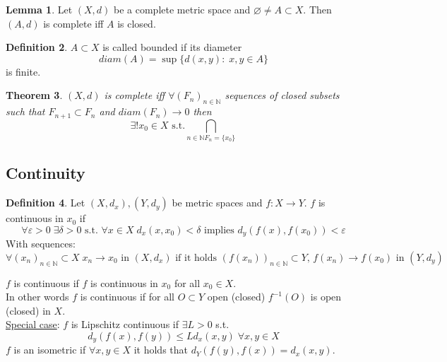 \documentclass[a4paper, 12pt]{article}
\theoremstyle{plain}
\newtheorem{theorem}{Theorem}[subsection] %
\theoremstyle{definition}
\newtheorem{definition}[theorem]{Definition} %
\theoremstyle{lemma}
\newtheorem{lemma}[theorem]{Lemma}
\theoremstyle{remark}
\theoremstyle{corollary}
\theoremstyle{example}
\begin{document}
	\begin{lemma}
		Let $(X,d)$ be a complete metric space and $\varnothing \neq A \subset X$. Then $(A,d)$ is complete iff $A$ is closed.
	\end{lemma}

	\begin{definition}
		$A \subset X$ is called bounded if its diameter \[diam(A) = \sup\{d(x,y): \; x,y \in A\}\] is finite.
	\end{definition}

	\begin{theorem}
		$(X,d)$ is complete iff $\forall (F_n)_{n \in \mathbb{N}}$ sequences of closed subsets such that $F_{n+1} \subset F_n$ and $diam(F_n) \to 0$ then \[\exists ! x_0 \in X \text{ s.t.} \bigcap\limits_{n \in \mathbb{N} F_n = \{x_0\}}\]
	\end{theorem}

	\subsection{Continuity}
	\begin{definition}
		Let $(X,d_x), (Y, d_y)$ be metric spaces and $f: X \to Y$. $f$ is continuous in $x_0$ if \[\forall \varepsilon > 0 \; \exists \delta > 0 \text{ s.t. } \forall x \in X \; d_x(x,x_0) < \delta \text{ implies } d_y(f(x),f(x_0)) < \varepsilon\]
		With sequences: \[\forall (x_n)_{n\in \mathbb{N}} \subset X \; x_n \to x_0 \text{ in } (X,d_x) \text{ if it holds } (f(x_n))_{n \in \mathbb{N}} \subset Y, \, f(x_n) \to f(x_0) \text{ in } (Y,d_y)\]
	\end{definition}
	$f$ is continuous if $f$ is continuous in $x_0$ for all $x_0 \in X$.\\
	In other words $f$ is continuous if for all $O \subset Y$ open (closed) $f^{-1}(O)$ is open (closed) in $X$.\\
	\underline{Special case}: $f$ is Lipschitz continuous if $\exists L > 0$ s.t. \[d_y(f(x),f(y)) \leq Ld_x(x,y) \; \forall x,y \in X\]
	$f$ is an isometric if $\forall x,y \in X$ it holds that $d_Y(f(y),f(x)) = d_x(x,y)$.
\end{document}
